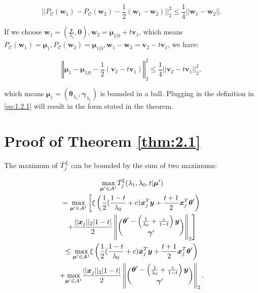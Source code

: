 \begin{equation}
    ||P_{\mathcal{C}}(\boldsymbol w_1)-P_{\mathcal{C}}(\boldsymbol w_2)-\frac{1}{2}(\boldsymbol w_1-\boldsymbol w_2)||_2^2\leq\frac{1}{4}||\boldsymbol w_1-\boldsymbol w_2||.
\end{equation}

If we choose $\boldsymbol w_1=(\frac{\boldsymbol y}{\lambda_1},\boldsymbol0),\boldsymbol w_2=\boldsymbol\mu_{1|0}+t\boldsymbol v_1$, which means $P_{\mathcal{C}}(\boldsymbol w_1)=\boldsymbol\mu_1,P_{\mathcal{C}}(\boldsymbol w_2)=\boldsymbol\mu_{1|0},\boldsymbol w_1-\boldsymbol w_2=\boldsymbol v_2-t\boldsymbol v_1$, we have:

\begin{equation}
    \left\Vert\boldsymbol\mu_1-\boldsymbol\mu_{1|0}-\frac{1}{2}(\boldsymbol v_2-t\boldsymbol v_1)\right\Vert_2^2\leq\frac{1}{4}||\boldsymbol v_2-t\boldsymbol v_1||_2^2,
\end{equation}

which means $\boldsymbol\mu_1=(\boldsymbol\theta_{\lambda_1},\boldsymbol\gamma_{\lambda_1})$ is bounded in a ball. Plugging in the definition in \eqref{eq:1.2.1} will result in the form stated in the theorem.

\section{Proof of Theorem \ref{thm:2.1}}

The maximum of $\Tilde{T}^\xi_j$ can be bounded by the sum of two maximums:

\begin{equation}
    \begin{gathered}
        \underset{\boldsymbol\mu'\in\mathcal{A}^1}{\mathrm{max}}\Tilde{T}^\xi_j(\lambda_1,\lambda_0,t|\boldsymbol\mu')\\
        =\underset{\boldsymbol\mu'\in\mathcal{A}^1}{\mathrm{max}}\left[\xi\left( \frac{1}{2}(\frac{1-t}{\lambda_0}+c)\boldsymbol x_j^T\boldsymbol y+\frac{t+1}{2}\boldsymbol x_j^T\boldsymbol\theta'\right)\right.\\\left.+\frac{||\boldsymbol x_j||_2|1-t|}{2}\left\Vert\binom{\boldsymbol\theta'-\left(\frac{1}{\lambda_0}+\frac{c}{1-t}\right)\boldsymbol y}{\boldsymbol\gamma'}\right\Vert_2\right]\\
        \leq \underset{\boldsymbol\mu'\in\mathcal{A}^1}{\mathrm{max}}\xi\left( \frac{1}{2}(\frac{1-t}{\lambda_0}+c)\boldsymbol x_j^T\boldsymbol y+\frac{t+1}{2}\boldsymbol x_j^T\boldsymbol\theta'\right)\\+\underset{\boldsymbol\mu'\in\mathcal{A}^1}{\mathrm{max}}\frac{||\boldsymbol x_j||_2|1-t|}{2}\left\Vert\binom{\boldsymbol\theta'-\left(\frac{1}{\lambda_0}+\frac{c}{1-t}\right)\boldsymbol y}{\boldsymbol\gamma'}\right\Vert_2.
    \end{gathered}
\end{equation}

